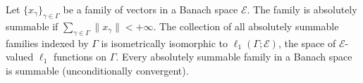 Let $\{x_\gamma\}_{\gamma \in \Gamma}$ be a family of vectors in a Banach space $\mathcal{E}$. The family is absolutely summable if $\sum_{\gamma \in \Gamma} \|x_\gamma\| < +\infty$. The collection of all absolutely summable families indexed by $\Gamma$ is isometrically isomorphic to $\ell_1(\Gamma; \mathcal{E})$, the space of $\mathcal{E}$-valued $\ell_1$ functions on $\Gamma$. Every absolutely summable family in a Banach space is summable (unconditionally convergent).
